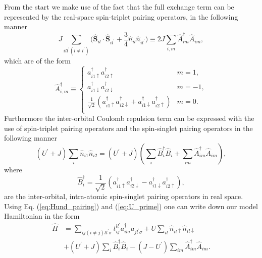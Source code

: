 \documentclass[aps,prb,showpacs,reprint]{revtex4-1}
\begin{document}
From the start we make use of the fact that the full exchange
term can be represented by the real-space spin-triplet pairing operators, in the
following
manner 
\begin{equation}
J\sum_{ill^{\prime}(l\neq l^{\prime})}\bigg(\mathbf{\hat{S}}_{il}\cdotp
\mathbf{\hat{S}}_{il^{\prime}}+\frac{3}{4}\hat{n}_{il}\hat{n}_{il^{\prime}}
\bigg)\equiv 2J\sum_{i,m}\hat{A}^{\dagger}_{im}\hat{A}_{im},
\label{eq:Hund_pairing}
\end{equation}
which are of the form
\begin{equation}
\hat{A}^{\dagger}_{i,m}\equiv\left\{\begin{array}{cl}
a^{\dagger}_{i1\uparrow}a^{\dagger}_{i2\uparrow} & m=1,\\
a^{\dagger}_{i1\downarrow}a^{\dagger}_{i2\downarrow} & m=-1,\\
\frac{1}{\sqrt{2}}(a^{\dagger}_{i1\uparrow}a^{\dagger}_{i2\downarrow}+a^{\dagger}_{i1\downarrow}a^{\dagger}_{i2\uparrow}) & m=0.\\
\end{array}\right.
\label{eq: A_op}
\end{equation} 
Furthermore the inter-orbital Coulomb repulsion term can be expressed with the
use of spin-triplet pairing operators and the spin-singlet pairing operators in the following manner
\begin{equation}
 (U^{\prime}+J)\sum_{i}\hat{n}_{i1}\hat{n}_{i2}=(U^{\prime}+J)(\sum_{i}\hat{B}^{\dagger}
_i \hat{B}_i + \sum_{im}\hat{A}^{\dagger}_{im} \hat{A}_{im} ),
\label{eq:U_prime}
\end{equation}
where 
\begin{equation}
 \hat{B}^{\dagger}_i=\frac{1}{\sqrt{2}}(a^{\dagger}_{i1\uparrow}a^{\dagger}_{
i2\downarrow }
-a^{\dagger}_{i1\downarrow}a^{\dagger}_{i2\uparrow}),
\end{equation}
are the inter-orbital, intra-atomic spin-singlet pairing operators in real space.
Using Eq. (\ref{eq:Hund_pairing}) and (\ref{eq:U_prime}) one can write down
our model Hamiltonian in the form
\begin{equation}
\begin{split}
\hat{H}&=\sum_{ij(i\neq j)ll^{\prime}\sigma}t^{ll^{\prime}}_{ij}
a_{il\sigma}^{\dag}a_{jl^{\prime}\sigma}
+ U\sum_{il}\hat{n}_{il\uparrow}\hat{n}_{
il\downarrow}\\
&+(U^{\prime}+J)\sum_{i}\hat{B}_i^{\dagger}\hat{B}_i
-(J-U^{\prime})\sum_ {im}\hat{A}^{\dagger}_{im} \hat{A}_{im}.
\label{eq:H_start2}
\end{split}
\end{equation}
\end{document}
